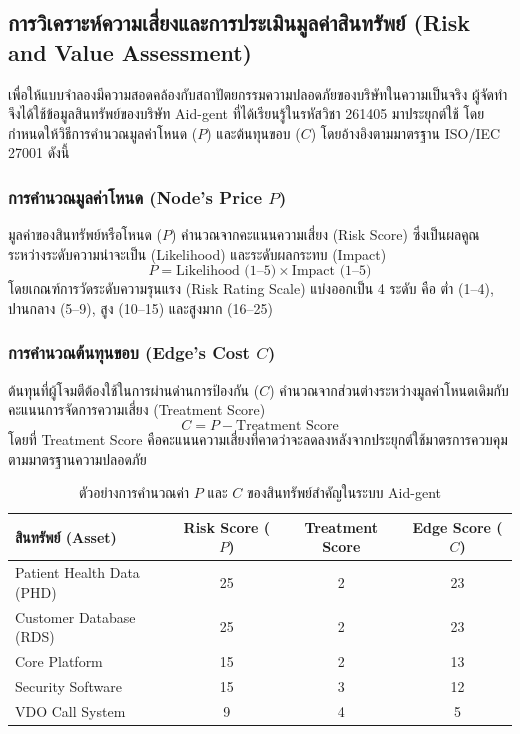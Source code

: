 \subsection{การวิเคราะห์ความเสี่ยงและการประเมินมูลค่าสินทรัพย์ (Risk and Value Assessment)}
เพื่อให้แบบจำลองมีความสอดคล้องกับสถาปัตยกรรมความปลอดภัยของบริษัทในความเป็นจริง ผู้จัดทำจึงได้ใช้ข้อมูลสินทรัพย์ของบริษัท Aid-gent ที่ได้เรียนรู้ในรหัสวิชา 261405 มาประยุกต์ใช้ โดยกำหนดให้วิธีการคำนวณมูลค่าโหนด ($P$) และต้นทุนขอบ ($C$) โดยอ้างอิงตามมาตรฐาน ISO/IEC 27001 ดังนี้

\subsubsection{การคำนวณมูลค่าโหนด (Node's Price $P$)}
มูลค่าของสินทรัพย์หรือโหนด ($P$) คำนวณจากคะแนนความเสี่ยง (Risk Score) ซึ่งเป็นผลคูณระหว่างระดับความน่าจะเป็น (Likelihood) และระดับผลกระทบ (Impact)
\begin{equation}
P = \text{Likelihood (1--5)} \times \text{Impact (1--5)}
\end{equation}
โดยเกณฑ์การวัดระดับความรุนแรง (Risk Rating Scale) แบ่งออกเป็น 4 ระดับ คือ ต่ำ (1--4), ปานกลาง (5--9), สูง (10--15) และสูงมาก (16--25)

\subsubsection{การคำนวณต้นทุนขอบ (Edge's Cost $C$)}
ต้นทุนที่ผู้โจมตีต้องใช้ในการผ่านด่านการป้องกัน ($C$) คำนวณจากส่วนต่างระหว่างมูลค่าโหนดเดิมกับคะแนนการจัดการความเสี่ยง (Treatment Score)
\begin{equation}
C = P - \text{Treatment Score}
\end{equation}
โดยที่ Treatment Score คือคะแนนความเสี่ยงที่คาดว่าจะลดลงหลังจากประยุกต์ใช้มาตรการควบคุมตามมาตรฐานความปลอดภัย

\begin{table}[h]
\centering
\label{tabrisk_calc}
\small
\begin{tabular}{|l|c|c|c|}
\hline
\textbf{สินทรัพย์ (Asset)} & \textbf{Risk Score ($P$)} & \textbf{Treatment Score} & \textbf{Edge Score ($C$)} \\ \hline
Patient Health Data (PHD) & 25 & 2 & 23 \\ \hline
Customer Database (RDS)   & 25 & 2 & 23 \\ \hline
Core Platform             & 15 & 2 & 13 \\ \hline
Security Software         & 15 & 3 & 12 \\ \hline
VDO Call System           & 9  & 4 & 5  \\ \hline
\end{tabular}
\caption{ตัวอย่างการคำนวณค่า $P$ และ $C$ ของสินทรัพย์สำคัญในระบบ Aid-gent}
\end{table}

